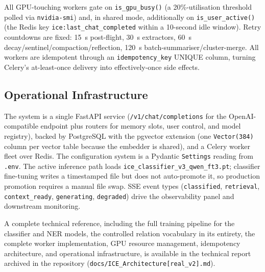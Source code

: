\documentclass[10pt]{article}
\begin{document}
All GPU-touching workers gate on \texttt{is\_gpu\_busy()} (a 20\%-utilisation threshold polled via \texttt{nvidia-smi}) and, in shared mode, additionally on \texttt{is\_user\_active()} (the Redis key \texttt{ice:last\_chat\_completed} within a 10-second idle window). Retry countdowns are fixed: 15~s post-flight, 30~s extractors, 60~s decay/sentinel/compaction/reflection, 120~s batch-summariser/cluster-merge. All workers are idempotent through an \texttt{idempotency\_key} UNIQUE column, turning Celery's at-least-once delivery into effectively-once side effects.

\subsection{Operational Infrastructure}

The system is a single FastAPI service (\texttt{/v1/chat/completions} for the OpenAI-compatible endpoint plus routers for memory slots, user control, and model registry), backed by PostgreSQL with the pgvector extension (one \texttt{Vector(384)} column per vector table because the embedder is shared), and a Celery worker fleet over Redis. The configuration system is a Pydantic \texttt{Settings} reading from \texttt{.env}. The active inference path loads \texttt{ice\_classifier\_v3\_qwen\_ft3.pt}; classifier fine-tuning writes a timestamped file but does not auto-promote it, so production promotion requires a manual file swap. SSE event types (\texttt{classified}, \texttt{retrieval}, \texttt{context\_ready}, \texttt{generating}, \texttt{degraded}) drive the observability panel and downstream monitoring.

A complete technical reference, including the full training pipeline for the classifier and NER models, the controlled relation vocabulary in its entirety, the complete worker implementation, GPU resource management, idempotency architecture, and operational infrastructure, is available in the technical report archived in the repository (\texttt{docs/ICE\_Architecture[real\_v2].md}).
\end{document}
